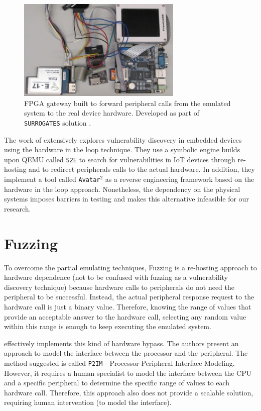 \begin{figure}[H]
    \centering
    \includegraphics[width=0.7\textwidth]{figs/surrogates.png}
    \caption{FPGA gateway built to forward peripheral calls from the emulated system to the real device hardware. Developed as part of {\tt SURROGATES} solution \cite{surrogates}.}
    \label{fig:surrogates}
\end{figure}
The work of \cite{avatar2} extensively explores vulnerability discovery in embedded devices using the hardware in the loop technique. They use a symbolic engine builds upon QEMU called {\tt S2E} to search for vulnerabilities in IoT devices through re-hosting and to redirect peripherals calls to the actual hardware. In addition, they implement a tool called {\tt Avatar$^2$} as a reverse engineering framework based on the hardware in the loop approach.  Nonetheless, the dependency on the physical systems imposes barriers in testing and makes this alternative infeasible for our research.

\section{Fuzzing}

To overcome the partial emulating techniques, Fuzzing is a re-hosting approach to hardware dependence (not to be confused with fuzzing as a vulnerability discovery technique) because hardware calls to peripherals do not need the peripheral to be successful. Instead, the actual peripheral response request to the hardware call is just a binary value. Therefore, knowing the range of values that provide an acceptable answer to the hardware call, selecting any random value within this range is enough to keep executing the emulated system.

\cite{p2im} effectively implements this kind of hardware bypass.  The authors present an approach to model the interface between the processor and the peripheral. The method suggested is called {\tt P2IM} - Processor-Peripheral Interface Modeling.  However, it requires a human specialist to model the interface between the CPU and a specific peripheral to determine the specific range of values to each hardware call. Therefore, this approach also does not provide a scalable solution, requiring human intervention (to model the interface).

